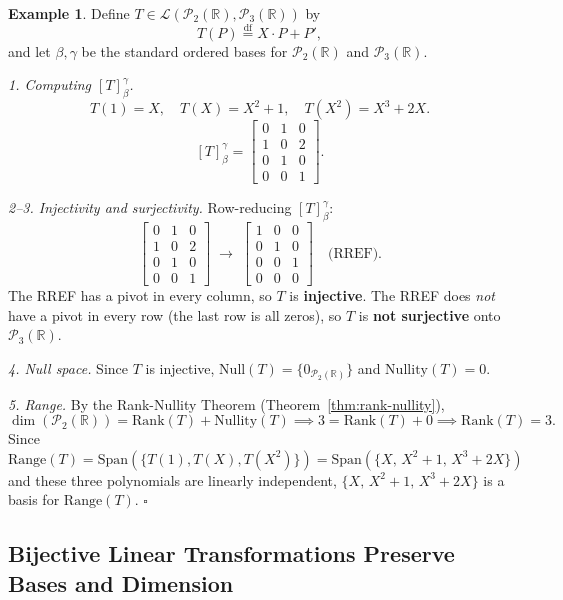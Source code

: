 \documentclass[11pt, a4paper, notitlepage]{report}
\theoremstyle{definition}
\newtheorem{example}[theorem]{Example}
\theoremstyle{remark}
\begin{document}
\begin{example}
\label{ex:injectivity-surjectivity-example}
Define $T \in \mathcal{L}(\mathscr{P}_2(\mathbb{R}), \mathscr{P}_3(\mathbb{R}))$ by
\[
  T(P) \stackrel{\mathrm{df}}{=} X \cdot P + P',
\]
and let $\beta,\gamma$ be the standard ordered bases for $\mathscr{P}_2(\mathbb{R})$ and
$\mathscr{P}_3(\mathbb{R})$.

\emph{1. Computing $[T]_\beta^\gamma$.}
\[
  T(1) = X,\quad T(X) = X^2+1,\quad T(X^2) = X^3+2X.
\]
\[
  [T]_\beta^\gamma =
  \begin{bmatrix} 0 & 1 & 0 \\ 1 & 0 & 2 \\ 0 & 1 & 0 \\ 0 & 0 & 1 \end{bmatrix}.
\]

\emph{2--3. Injectivity and surjectivity.}  Row-reducing $[T]_\beta^\gamma$:
\[
  \begin{bmatrix} 0&1&0\\1&0&2\\0&1&0\\0&0&1 \end{bmatrix}
  \;\longrightarrow\;
  \begin{bmatrix} 1&0&0\\0&1&0\\0&0&1\\0&0&0 \end{bmatrix} \quad\text{(RREF).}
\]
The RREF has a pivot in every column, so $T$ is \textbf{injective}.  The RREF does
\emph{not} have a pivot in every row (the last row is all zeros), so $T$ is \textbf{not
surjective} onto $\mathscr{P}_3(\mathbb{R})$.

\emph{4. Null space.}  Since $T$ is injective, $\mathrm{Null}(T) = \{0_{\mathscr{P}_2(\mathbb{R})}\}$
and $\mathrm{Nullity}(T) = 0$.

\emph{5. Range.}  By the Rank-Nullity Theorem (Theorem~\ref{thm:rank-nullity}),
\[
  \dim(\mathscr{P}_2(\mathbb{R})) = \mathrm{Rank}(T) + \mathrm{Nullity}(T)
  \implies 3 = \mathrm{Rank}(T) + 0 \implies \mathrm{Rank}(T) = 3.
\]
Since $\mathrm{Range}(T) = \mathrm{Span}(\{T(1), T(X), T(X^2)\}) = \mathrm{Span}(\{X,\, X^2+1,\, X^3+2X\})$
and these three polynomials are linearly independent, $\{X,\, X^2+1,\, X^3+2X\}$ is a basis
for $\mathrm{Range}(T)$. $\square$
\end{example}

\subsection{Bijective Linear Transformations Preserve Bases and Dimension}
\end{document}
